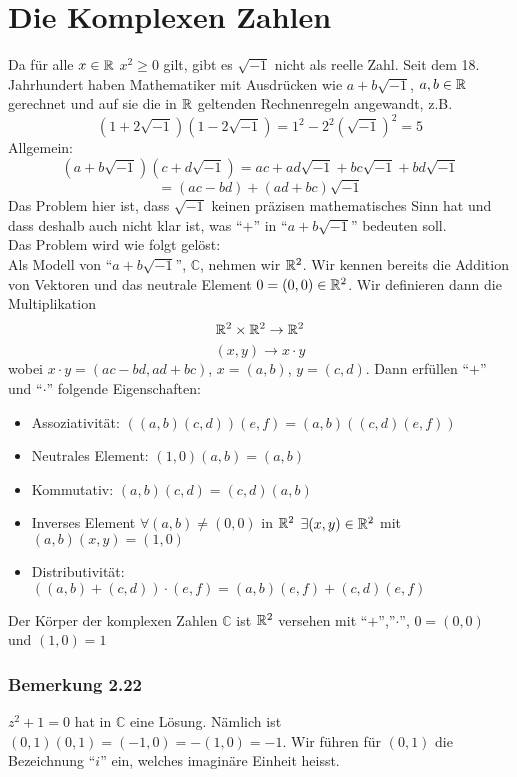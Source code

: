 \section{Die Komplexen Zahlen}
Da für alle $x\in\mathbb{R}$ $x^2\geq 0$ gilt, gibt es $\sqrt{-1}$ nicht als reelle Zahl. Seit dem 18. Jahrhundert haben Mathematiker mit Ausdrücken wie $a+b\sqrt{-1}$, $a,b\in\mathbb{R}$ gerechnet und auf sie die in $\mathbb{R}$ geltenden Rechnenregeln angewandt, z.B. \[\left( 1+2\sqrt{-1}\right)\left( 1-2\sqrt{-1}\right) = 1^2 - 2^2\left( \sqrt{-1}\right)^2 = 5\]
Allgemein:
\[\left( a+b\sqrt{-1} \right)\left( c+d\sqrt{-1}\right) = ac + ad\sqrt{-1} + bc\sqrt{-1}+bd\sqrt{-1}\]
\[=\left( ac-bd\right)+\left(ad+bc\right)\sqrt{-1}\]
Das Problem hier ist, dass $\sqrt{-1}$ keinen präzisen mathematisches Sinn hat und dass deshalb auch nicht klar ist, was ``$+$'' in ``$a+b\sqrt{-1}$'' bedeuten soll. \\

\noindent Das Problem wird wie folgt gelöst:\\

Als Modell von ``$a+b\sqrt{-1}$'', $\mathbb{C}$, nehmen wir $\mathbb{R}^2$. Wir kennen bereits die Addition von Vektoren und das neutrale Element $0 = (0,0) \in \mathbb{R}^2$. Wir definieren dann die Multiplikation \[\mathbb{R}^2 \times\mathbb{R}^2 \to \mathbb{R}^2\] \[(x,y)\to x\cdot y \]
wobei $x\cdot y=(ac-bd,ad+bc)$, $x=(a,b)$, $y=(c,d)$. Dann erfüllen ``$+$'' und ``$\cdot$'' folgende Eigenschaften:
\begin{itemize}
\item Assoziativität: $\left((a,b)(c,d)\right)(e,f)=(a,b)\left((c,d)(e,f) \right)$
\item Neutrales Element: $(1,0)(a,b)=(a,b)$
\item Kommutativ: $(a,b)(c,d)=(c,d)(a,b)$
\item Inverses Element $\forall (a,b)\not = (0,0)$ in $\mathbb{R}^2$ $\exists(x,y)\in\mathbb{R}^2$ mit $(a,b)(x,y)=(1,0)$
\item Distributivität: $\left( (a,b)+(c,d)\right)\cdot (e,f)=(a,b)(e,f)+(c,d)(e,f)$
\end{itemize}

\begin{definition}{2.21}
Der Körper der komplexen Zahlen $\mathbb{C}$ ist $\mathbb{R}^2$ versehen mit ``$+$'',''$\cdot$'', $0=(0,0)$ und $(1,0)=1$
\end{definition}

\subsubsection*{Bemerkung 2.22}
$z^2+1=0$ hat in $\mathbb{C}$ eine Lösung. Nämlich ist $(0,1)(0,1)=(-1,0)=-(1,0)=-1$. Wir führen für $(0,1)$ die Bezeichnung ``$i$'' ein, welches imaginäre Einheit heisst.\\

